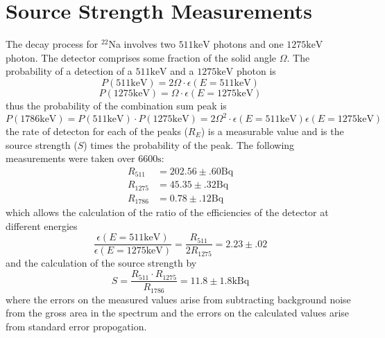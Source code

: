 \documentclass[12pt, a4paper]{article}
\begin{document}
\section{Source Strength Measurements}
	The decay process for $^{22}$Na involves two $511\unit{\keV}$ photons and one $1275\unit{\keV}$ photon. The detector comprises some fraction of the solid angle $\Omega$. The probability of a detection of a $511\unit{\keV}$ and a $1275\unit{\keV}$ photon is
	\begin{equation}
		P(511\unit{\keV}) = 2\Omega\cdot\epsilon(E=511\unit{\keV})
	\end{equation}
	\begin{equation}
		P(1275\unit{\keV}) = \Omega\cdot\epsilon(E=1275\unit{\keV})
	\end{equation}
	thus the probability of the combination sum peak is
	\begin{equation}
		P(1786\unit{\keV}) = P(511\unit{\keV})\cdot P(1275\unit{\keV}) = 2\Omega^2\cdot\epsilon(E=511\unit{\keV})\epsilon(E=1275\unit{\keV})
	\end{equation}
	the rate of detecton for each of the peaks ($R_E$) is a measurable value and is the source strength ($S$) times the probability of the peak. The following measurements were taken over $6600\unit{\s}$:
	\begin{align*}
		R_{511} &= 202.56\pm.60\unit{\becquerel}\\
		R_{1275} &= 45.35\pm.32\unit{\becquerel}\\
		R_{1786} &= 0.78\pm.12\unit{\becquerel}
	\end{align*}
	which allows the calculation of the ratio of the efficiencies of the detector at different energies
	\begin{equation}
		\frac{\epsilon(E=511\unit{\keV})}{\epsilon(E=1275\unit{\keV})} = \frac{R_{511}}{2R_{1275}} = 2.23\pm.02
	\end{equation}
	and the calculation of the source strength by
	\begin{equation}
		S = \frac{R_{511}\cdot R_{1275}}{R_{1786}} = 11.8\pm1.8\unit{\kilo\becquerel}
	\end{equation}
	where the errors on the measured values arise from subtracting background noise from the gross area in the spectrum and the errors on the calculated values arise from standard error propogation.
\end{document}
